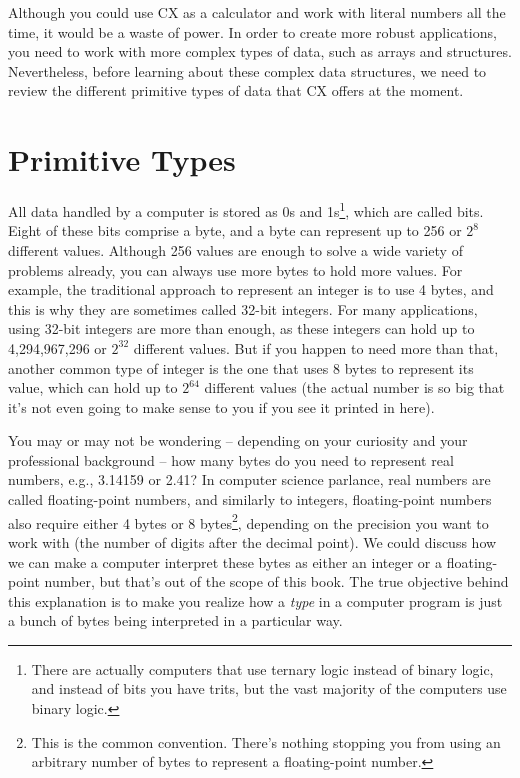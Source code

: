 \documentclass[11pt,fleqn,openany]{book} %
\begin{document}
Although you could use CX as a calculator and work with literal numbers all the time, it would be a waste of power. In order to create more robust applications, you need to work with more complex types of data, such as arrays and structures. Nevertheless, before learning about these complex data structures, we need to review the different primitive types of data that CX offers at the moment.

\section{Primitive Types}


All data handled by a computer is stored as 0s and 1s\footnote{There are actually computers that use ternary logic instead of binary logic, and instead of bits you have trits, but the vast majority of the computers use binary logic.}, which are called bits. Eight of these bits comprise a byte, and a byte can represent up to 256 or $2^8$ different values. Although 256 values are enough to solve a wide variety of problems already, you can always use more bytes to hold more values. For example, the traditional approach to represent an integer is to use 4 bytes, and this is why they are sometimes called 32-bit integers. For many applications, using 32-bit integers are more than enough, as these integers can hold up to 4,294,967,296 or $2^{32}$ different values. But if you happen to need more than that, another common type of integer is the one that uses 8 bytes to represent its value, which can hold up to $2^{64}$ different values (the actual number is so big that it's not even going to make sense to you if you see it printed in here).

You may or may not be wondering -- depending on your curiosity and your professional background -- how many bytes do you need to represent real numbers, e.g., 3.14159 or 2.41? In computer science parlance, real numbers are called floating-point numbers, and similarly to integers, floating-point numbers also require either 4 bytes or 8 bytes\footnote{This is the common convention. There's nothing stopping you from using an arbitrary number of bytes to represent a floating-point number.}, depending on the precision you want to work with (the number of digits after the decimal point). We could discuss how we can make a computer interpret these bytes as either an integer or a floating-point number, but that's out of the scope of this book. The true objective behind this explanation is to make you realize how a \emph{type} in a computer program is just a bunch of bytes being interpreted in a particular way.
\end{document}
